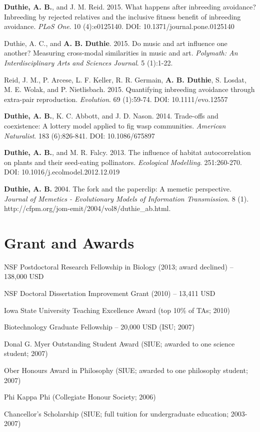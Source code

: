 \documentclass[letterpaper]{article}
\renewenvironment{itemize}{
  \begin{list}{}{
    \setlength{\leftmargin}{1.5em}
  }
}{
  \end{list}
}
\begin{document}
\begin{itemize}
\item {\bf Duthie, A. B.}, and J. M. Reid. 2015. What happens after inbreeding avoidance? Inbreeding by rejected relatives and the inclusive fitness benefit of inbreeding avoidance. {\it PLoS One}. 10 (4):e0125140. DOI: 10.1371/journal.pone.0125140
\item Duthie, A. C., and {\bf A. B. Duthie}. 2015. Do music and art influence one another? Measuring cross-modal similarities in music and art. {\it Polymath: An Interdisciplinary Arts and Sciences Journal}. 5 (1):1-22.
\item Reid, J. M., P. Arcese, L. F. Keller, R. R. Germain, {\bf A. B. Duthie}, S. Losdat, M. E. Wolak, and P. Nietlisbach. 2015. Quantifying inbreeding avoidance through extra-pair reproduction. {\it Evolution}. 69 (1):59-74. DOI: 10.1111/evo.12557
\item {\bf Duthie, A. B.}, K. C. Abbott, and J. D. Nason. 2014. Trade-offs and coexistence: A lottery model applied to fig wasp communities. {\it American Naturalist}. 183 (6):826-841. DOI: 10.1086/675897
\item {\bf Duthie, A. B.}, and M. R. Falcy. 2013. The influence of habitat autocorrelation on plants and their seed-eating pollinators. {\it Ecological Modelling}. 251:260-270. DOI: 10.1016/j.ecolmodel.2012.12.019
\item {\bf Duthie, A. B.} 2004. The fork and the paperclip: A memetic perspective. {\it Journal of Memetics - Evolutionary Models of Information Transmission}. 8 (1). http://cfpm.org/jom-emit/2004/vol8/duthie\_ab.html.
\end{itemize}

\section*{Grant and Awards}
\begin{itemize}
\item NSF Postdoctoral Research Fellowship in Biology (2013; award declined) -- 138,000 USD
\item NSF Doctoral Dissertation Improvement Grant (2010) -- 13,411 USD
\item Iowa State University Teaching Excellence Award (top 10\% of TAs; 2010)
\item Biotechnology Graduate Fellowship -- 20,000 USD (ISU; 2007)
\item Donal G. Myer Outstanding Student Award (SIUE; awarded to one science student; 2007)
\item Ober Honours Award in Philosophy (SIUE; awarded to one philosophy student; 2007)
\item Phi Kappa Phi (Collegiate Honour Society; 2006)
\item Chancellor's Scholarship (SIUE; full tuition for undergraduate education; 2003-2007)
\end{itemize}
\end{document}
